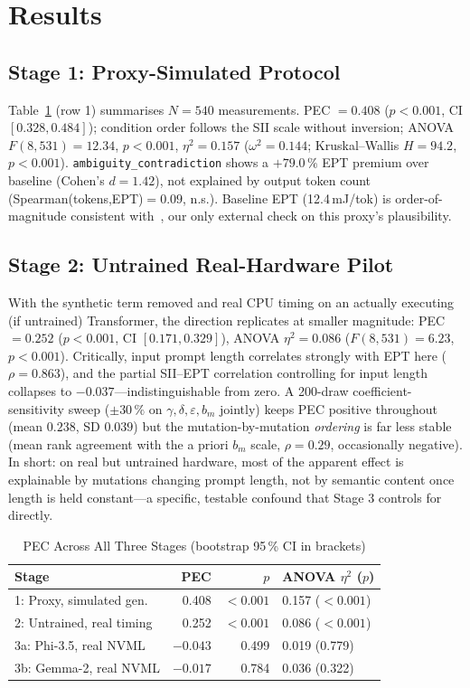 \documentclass[conference]{IEEEtran}
\begin{document}
\section{Results}
\label{sec:results}
\subsection{Stage 1: Proxy-Simulated Protocol}
\label{sec:results-stage1}
Table~\ref{tab:stage-summary} (row 1) summarises $N=540$ measurements.
PEC $=0.408$ ($p<0.001$, CI $[0.328,0.484]$); condition order follows
the SII scale without inversion; ANOVA $F(8,531)=12.34$, $p<0.001$,
$\eta^2=0.157$ ($\omega^2=0.144$; Kruskal--Wallis $H=94.2$, $p<0.001$).
\texttt{ambiguity\_contradiction} shows a $+79.0\,\%$ EPT premium over
baseline (Cohen's $d=1.42$), not explained by output token count
(Spearman(tokens,EPT)$=0.09$, n.s.). Baseline EPT (12.4\,mJ/tok) is
order-of-magnitude consistent with~\cite{samsi2023words,faiz2024llmcarbon},
our only external check on this proxy's plausibility.
\subsection{Stage 2: Untrained Real-Hardware Pilot}
\label{sec:results-stage2}
With the synthetic term removed and real CPU timing on an actually
executing (if untrained) Transformer, the direction replicates at
smaller magnitude: PEC $=0.252$ ($p<0.001$, CI $[0.171,0.329]$),
ANOVA $\eta^2=0.086$ ($F(8,531)=6.23$, $p<0.001$). Critically, input
prompt length correlates strongly with EPT here ($\rho=0.863$), and
the partial SII--EPT correlation controlling for input length
collapses to $-0.037$---indistinguishable from zero. A 200-draw
coefficient-sensitivity sweep ($\pm30\,\%$ on $\gamma,\delta,
\varepsilon,b_m$ jointly) keeps PEC positive throughout (mean
$0.238$, SD $0.039$) but the mutation-by-mutation \emph{ordering}
is far less stable (mean rank agreement with the a priori $b_m$ scale,
$\rho=0.29$, occasionally negative). In short: on real but untrained
hardware, most of the apparent effect is explainable by mutations
changing prompt length, not by semantic content once length is held
constant---a specific, testable confound that Stage 3 controls for
directly.
\begin{table}[t]
\caption{PEC Across All Three Stages (bootstrap 95\,\% CI in brackets)}
\label{tab:stage-summary}
\centering
\setlength{\tabcolsep}{3pt}
\begin{tabular}{@{}lrrl@{}}
\toprule
\textbf{Stage} & \textbf{PEC} & \textbf{$p$} & \textbf{ANOVA $\eta^2$ ($p$)} \\
\midrule
1: Proxy, simulated gen. & 0.408 & $<0.001$ & 0.157 ($<0.001$) \\
2: Untrained, real timing & 0.252 & $<0.001$ & 0.086 ($<0.001$) \\
3a: Phi-3.5, real NVML & $-0.043$ & 0.499 & 0.019 (0.779) \\
3b: Gemma-2, real NVML & $-0.017$ & 0.784 & 0.036 (0.322) \\
\bottomrule
\end{tabular}
\end{table}
\end{document}
